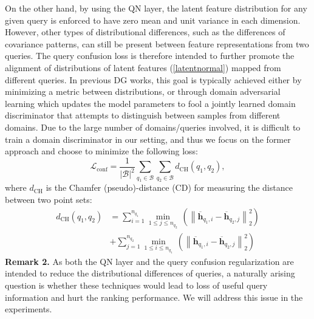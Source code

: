 \documentclass[letterpaper]{article}
\begin{document}
On the other hand, by using the QN layer, the latent feature distribution for any given query is enforced to have zero mean and unit variance in each dimension. However, other types of distributional differences, such as the differences of covariance patterns, can still be present between feature representations from two queries. The query confusion loss is therefore intended to further promote the alignment of distributions of latent features (\ref{latentnormal}) mapped from different queries. In previous DG works, this goal is typically achieved either by minimizing a metric between distributions, or through domain adversarial learning \cite{ganin2016domain,cohen2018cross} which updates the model parameters to fool a jointly learned domain discriminator that attempts to distinguish between samples from different domains. Due to the large number of domains/queries involved, it is difficult to train a domain discriminator in our setting, and thus we focus on the former approach and choose to minimize the following loss:
\begin{equation}
{{\mathcal{L}}_{\text{conf}}}=\frac{1}{{{\left| \mathcal{B} \right|}^{2}}}\sum\limits_{{{q}_{1}}\in \mathcal{B}}{\sum\limits_{{{q}_{2}}\in \mathcal{B}}{{{d}_{\text{CH}}}\left( {{q}_{1}},{{q}_{2}} \right)}},
\end{equation}
where ${{d}_{\text{CH}}}$ is the Chamfer (pseudo)-distance (CD) \cite{fan2017point} for measuring the distance between two point sets:
\begin{equation}
\begin{aligned}
{{d}_{\text{CH}}}\left( {{q}_{1}},{{q}_{2}} \right)&=\sum\limits_{i=1}^{{{n}_{{{q}_{1}}}}}{\underset{1\le j\le {{n}_{{{q}_{2}}}}}{\mathop{\min }}\,\left( \left\| {{\overline{\mathbf{h}}}_{{{q}_{1}},i}}-{{\overline{\mathbf{h}}}_{{{q}_{2}},j}} \right\|_{2}^{2} \right)} \\
& +\sum\limits_{j=1}^{{{n}_{{{q}_{2}}}}}{\underset{1\le i\le {{n}_{{{q}_{1}}}}}{\mathop{\min }}\,\left( \left\| {{\overline{\mathbf{h}}}_{{{q}_{1}},i}}-{{\overline{\mathbf{h}}}_{{{q}_{2}},j}} \right\|_{2}^{2} \right)}
\end{aligned}
\end{equation}
\noindent \textbf{Remark 2.} As both the QN layer and the query confusion regularization are intended to reduce the distributional differences of queries, a naturally arising question is whether these techniques would lead to loss of useful query information and hurt the ranking performance. We will address this issue in the experiments.
\end{document}
